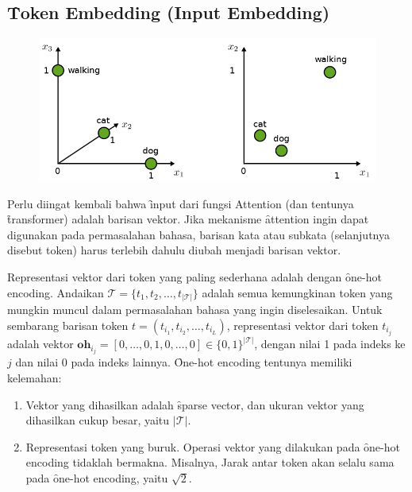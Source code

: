 	\subsection{\f{Token Embedding (Input Embedding)}}
	\label{sec:token-embedding}
	\begin{figure}[!ht]
		\centering
		\includegraphics[width=1\textwidth]{assets/pics/token-embedding.png}
		\label{fig:token-embedding}
	\end{figure}
	Perlu diingat kembali bahwa \f{input} dari fungsi Attention (dan tentunya \f{transformer}) adalah barisan vektor. Jika mekanisme \f{attention} ingin dapat digunakan pada permasalahan bahasa, barisan kata atau subkata (selanjutnya disebut token) harus terlebih dahulu diubah menjadi barisan vektor.

	Representasi vektor dari token yang paling sederhana adalah dengan \f{one-hot encoding}. Andaikan $\mathcal{T} = \{t_1, t_2, \dots, t_{|\mathcal{T}|}\}$ adalah semua kemungkinan token yang mungkin muncul dalam permasalahan bahasa yang ingin diselesaikan. Untuk sembarang barisan token $t = (t_{i_1}, t_{i_2}, \dots, t_{i_L})$, representasi vektor dari token $t_{i_j}$ adalah vektor $\mathbf{oh}_{i_j} = [0, \dots, 0, 1, 0, \dots, 0] \in\{0,1\}^{|\mathcal{T}|}$, dengan nilai 1 pada indeks ke $j$ dan nilai 0 pada indeks lainnya. \f{One-hot encoding} tentunya memiliki kelemahan:
	\begin{enumerate}
		\item Vektor yang dihasilkan adalah \f{sparse vector}, dan ukuran vektor yang dihasilkan cukup besar, yaitu $|\mathcal{T}|$.
		\item Representasi token yang buruk. Operasi vektor yang dilakukan pada \f{one-hot encoding} tidaklah bermakna. Misalnya, Jarak antar token akan selalu sama pada \f{one-hot encoding}, yaitu $\sqrt{2}$.
	\end{enumerate}

